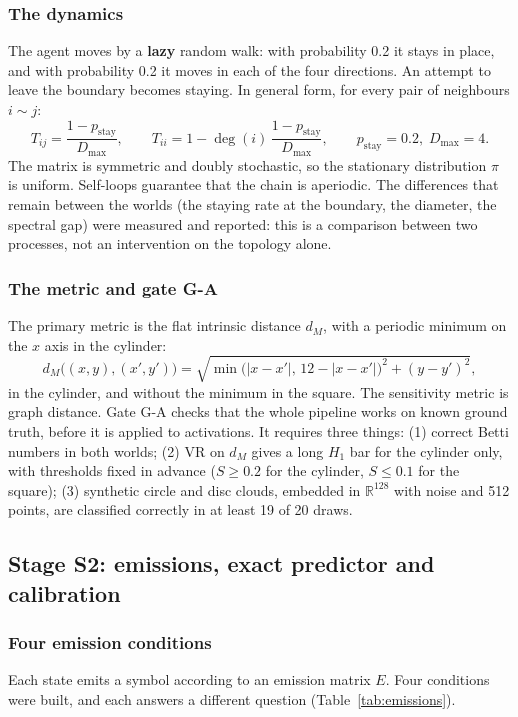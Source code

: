 \documentclass[12pt,a4paper]{article}
\newcommand{\en}[1]{\foreignlanguage{english}{#1}}   %
\begin{document}
\subsubsection{The dynamics}
The agent moves by a \textbf{lazy} random walk: with probability 0.2 it stays in place, and with probability 0.2 it moves in each of the four directions. An attempt to leave the boundary becomes staying. In general form, for every pair of neighbours $i\sim j$:
\begin{equation}
T_{ij}=\frac{1-p_{\mathrm{stay}}}{D_{\max}},\qquad
T_{ii}=1-\deg(i)\,\frac{1-p_{\mathrm{stay}}}{D_{\max}},\qquad
p_{\mathrm{stay}}=0.2,\; D_{\max}=4 .
\end{equation}
The matrix is symmetric and doubly stochastic, so the stationary distribution $\pi$ is uniform. Self-loops guarantee that the chain is aperiodic. The differences that remain between the worlds (the staying rate at the boundary, the diameter, the spectral gap) were measured and reported: this is a comparison between two processes, not an intervention on the topology alone.

\subsubsection{The metric and gate \en{G-A}}
The primary metric is the flat intrinsic distance $d_M$, with a periodic minimum on the $x$ axis in the cylinder:
\begin{equation}
d_M\big((x,y),(x',y')\big)=\sqrt{\min\!\big(|x-x'|,\,12-|x-x'|\big)^2+(y-y')^2},
\end{equation}
in the cylinder, and without the minimum in the square. The sensitivity metric is graph distance. Gate \en{G-A} checks that the whole pipeline works on known ground truth, before it is applied to activations. It requires three things: (1) correct Betti numbers in both worlds; (2) \en{VR} on $d_M$ gives a long $H_1$ bar for the cylinder only, with thresholds fixed in advance ($S\ge0.2$ for the cylinder, $S\le0.1$ for the square); (3) synthetic circle and disc clouds, embedded in $\mathbb{R}^{128}$ with noise and 512 points, are classified correctly in at least 19 of 20 draws.

\subsection{Stage S2: emissions, exact predictor and calibration}\label{sec:s2}
\subsubsection{Four emission conditions}
Each state emits a symbol according to an emission matrix $E$. Four conditions were built, and each answers a different question (Table~\ref{tab:emissions}).
\end{document}
